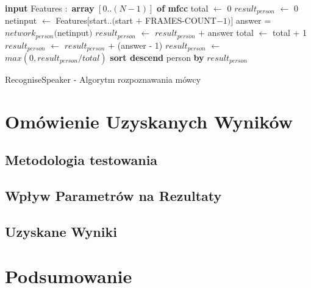 \documentclass[a4paper]{article}
\begin{document}
		\begin{algorithm}
			\begin{algorithmic}[1]
				\STATE \textbf{input} Features $:$ \textbf{array} $[0 .. (N-1)]$ \textbf{of mfcc}
				\STATE				
				\STATE total $\leftarrow$ 0
					\STATE $result_{person}$ $\leftarrow$ 0
				\ENDFOR
				\STATE
					\STATE {}
					\STATE {}
					\STATE netinput $\leftarrow$ Features$[$start$ .. ($start $+$ FRAMES-COUNT$-1)]$
					\STATE
						\STATE answer = $network_{person}($netinput$)$
								\STATE $result_{person}$ $\leftarrow$ $result_{person}$ $+$ answer
								\STATE total $\leftarrow$ total + 1
							\ELSE
								\STATE $result_{person}$ $\leftarrow$ $result_{person}$ $+$ (answer - 1)
							\ENDIF
							\STATE {}
						\ENDIF	
					\ENDFOR
				\ENDFOR
				\STATE
					\STATE $result_{person}$ $\leftarrow$ $max(0, result_{person} / total)$
				\ENDFOR
				\STATE \textbf{sort descend} person \textbf{by} $result_{person}$
			\end{algorithmic}			
			\caption{RecogniseSpeaker - Algorytm rozpoznawania mówcy}
			\label{alg:recognise}
		\end{algorithm}
		\clearpage
	
\section{Omówienie Uzyskanych Wyników}
	\subsection{Metodologia testowania}
	\subsection{Wpływ Parametrów na Rezultaty}
	\subsection{Uzyskane Wyniki}
\section{Podsumowanie}
\end{document}
